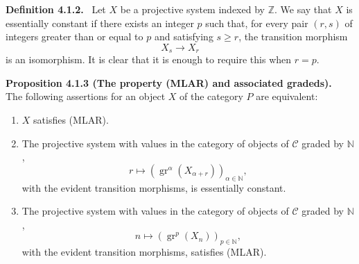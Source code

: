 \documentclass[11pt]{article}
\providecommand{\ZZ}{\mathbb{Z}}
\providecommand{\NN}{\mathbb{N}}
\newenvironment{statement}[1]{\par\medskip\noindent\textbf{#1.}\ }{\par\medskip}
\providecommand{\gr}{\operatorname{gr}}
\providecommand{\NN}{\mathbb N}
\providecommand{\cC}{\mathcal C}
\providecommand{\gr}{\operatorname{gr}}
\providecommand{\gr}{\operatorname{gr}}
\providecommand{\cC}{\mathcal C}
\begin{document}
\label{sga5:V:definition:4.1.2}\begin{statement}{Definition 4.1.2}
Let $X$ be a projective system indexed by $\ZZ$. We say that $X$ is essentially constant if there exists an integer $p$ such that, for every pair $(r,s)$ of integers greater than or equal to $p$ and satisfying $s\ge r$, the transition morphism
\[
X_s\longrightarrow X_r
\]
is an isomorphism. It is clear that it is enough to require this when $r=p$.
\end{statement}

\label{sga5:V:proposition:4.1.3}\begin{statement}{Proposition 4.1.3 (The property (MLAR) and associated gradeds)}
The following assertions for an object $X$ of the category $P$ are equivalent:
\begin{enumerate}[label=(\roman*)]
\item $X$ satisfies (MLAR).
\item The projective system with values in the category of objects of $\cC$ graded by $\NN$,
\[
r\longmapsto (\gr^\alpha(X_{\alpha+r}))_{\alpha\in\NN},
\]
with the evident transition morphisms, is essentially constant.
\item The projective system with values in the category of objects of $\cC$ graded by $\NN$,
\[
n\longmapsto (\gr^p(X_n))_{p\in\NN},
\]
with the evident transition morphisms, satisfies (MLAR).
\end{enumerate}
\end{statement}
\end{document}

